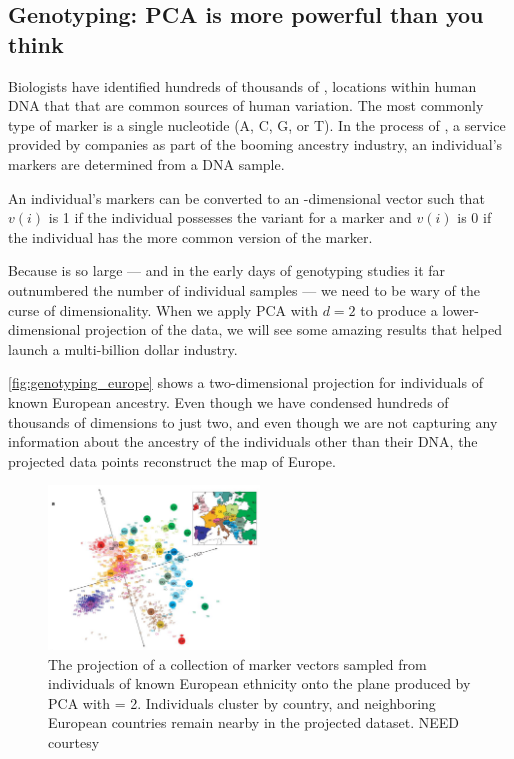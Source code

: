 \FloatBarrier
{}
\subsection{Genotyping: PCA is more powerful than you think}

Biologists have identified hundreds of thousands of , locations within human DNA that that are common sources of human variation. The most commonly type of marker is a single nucleotide (A, C, G, or T). In the process of , a service provided by companies as part of the booming ancestry industry, an individual's markers are determined from a DNA sample.

An individual's  markers can be converted to an -dimensional vector  such that $v(i)$ is 1 if the individual possesses the variant for a marker and $v(i)$ is 0 if the individual has the more common version of the marker.

\begin{note}\end{note}

Because  is so large --- and in the early days of genotyping studies it far outnumbered the number of individual samples --- we need to be wary of the curse of dimensionality. When we apply PCA with $d = 2$ to produce a lower-dimensional projection of the data, we will see some amazing results that helped launch a multi-billion dollar industry.

\autoref{fig:genotyping_europe} shows a two-dimensional projection for individuals of known European ancestry. Even though we have condensed hundreds of thousands of dimensions to just two, and even though we are not capturing any information about the ancestry of the individuals other than their DNA, the projected data points reconstruct the map of Europe.\\

\begin{figure}[h]
\centering
\mySfFamily
\includegraphics[width = 0.5\textwidth]{../images/genotyping_europe.png}
\caption{The projection of a collection of marker vectors sampled from individuals of known European ethnicity onto the plane produced by PCA with  = 2. Individuals cluster by country, and neighboring European countries remain nearby in the projected dataset. NEED courtesy}
\label{fig:genotyping_europe}
\end{figure}


